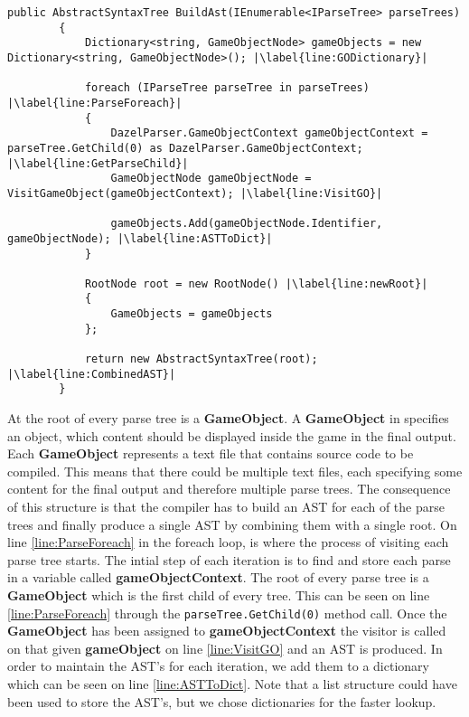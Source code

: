 \begin{lstlisting}[caption={The BuildAst method}, label={lst:BuildAstMethod},escapechar=|]
    public AbstractSyntaxTree BuildAst(IEnumerable<IParseTree> parseTrees)
        {
            Dictionary<string, GameObjectNode> gameObjects = new Dictionary<string, GameObjectNode>(); |\label{line:GODictionary}|
            
            foreach (IParseTree parseTree in parseTrees) |\label{line:ParseForeach}|
            {
                DazelParser.GameObjectContext gameObjectContext = parseTree.GetChild(0) as DazelParser.GameObjectContext; |\label{line:GetParseChild}|
                GameObjectNode gameObjectNode = VisitGameObject(gameObjectContext); |\label{line:VisitGO}|
                
                gameObjects.Add(gameObjectNode.Identifier, gameObjectNode); |\label{line:ASTToDict}|
            }

            RootNode root = new RootNode() |\label{line:newRoot}|
            {
                GameObjects = gameObjects
            };
            
            return new AbstractSyntaxTree(root); |\label{line:CombinedAST}|
        }
\end{lstlisting}

At the root of every parse tree is a \textbf{GameObject}. A \textbf{GameObject} in \dazel{} specifies an object, which content should be displayed inside the game in the final output. Each \textbf{GameObject} represents a text file that contains source code to be compiled. This means that there could be multiple text files, each specifying some content for the final output and therefore multiple parse trees. 
The consequence of this structure is that the compiler has to build an AST for each of the parse trees and finally produce a single AST by combining them with a single root. On line \ref{line:ParseForeach} in the foreach loop, is where the process of visiting each parse tree starts. 
The intial step of each iteration is to find and store each parse in a variable called \textbf{gameObjectContext}. The root of every parse tree is a \textbf{GameObject} which is the first child of every tree. This can be seen on line \ref{line:ParseForeach} through the \texttt{parseTree.GetChild(0)} method call.
Once the \textbf{GameObject} has been assigned to \textbf{gameObjectContext} the visitor is called on that given \textbf{gameObject} on line \ref{line:VisitGO} and an AST is produced. 
In order to maintain the AST's for each iteration, we add them to a dictionary which can be seen on line \ref{line:ASTToDict}. 
Note that a list structure could have been used to store the AST's, but we chose dictionaries for the faster lookup.

